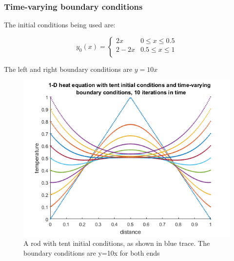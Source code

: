 \documentclass[a4paper, 12pt]{article}
\begin{document}
\newpage
\subsubsection{Time-varying boundary conditions}
The initial conditions being used are:

\[ y_0(\textit{x})=
	\begin{cases} 
      2x & 0\leq x\leq 0.5 \\
      2-2x & 0.5\leq x\leq 1 \\
   \end{cases}\]


The left and right boundary conditions are \(y=10x\)

\begin{figure}[h]
\centering
\includegraphics[width=\textwidth]{exbonus/timebound.png}
\caption{A rod with tent initial conditions, as shown in blue trace. The boundary conditions are y=10x for both ends}
\end{figure}




\newpage
\end{document}
